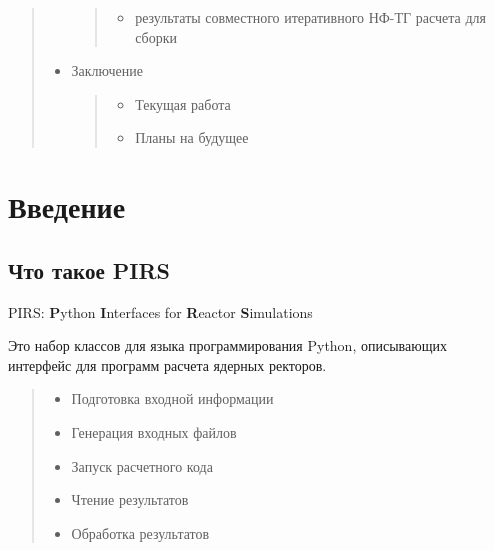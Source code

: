 \documentclass[a4paper]{article}
\begin{document}
\begin{quote}
\begin{itemize}
\begin{quote}
\begin{itemize}
\item результаты совместного итеративного НФ-ТГ расчета для сборки

\end{itemize}

\end{quote}

\item Заключение
%
\begin{quote}
%
\begin{itemize}

\item Текущая работа

\item Планы на будущее

\end{itemize}

\end{quote}

\end{itemize}

\end{quote}


\section{Введение%
  \label{id2}%
}


\subsection{Что такое PIRS%
  \label{pirs}%
}

PIRS: \textbf{P}ython \textbf{I}nterfaces for \textbf{R}eactor \textbf{S}imulations

Это набор классов для языка программирования Python, описывающих интерфейс для
программ расчета ядерных ректоров.
%
\begin{quote}
%
\begin{itemize}

\item Подготовка входной информации

\item Генерация входных файлов

\item Запуск расчетного кода

\item Чтение результатов

\item Обработка результатов

\end{itemize}

\end{quote}
\end{document}
